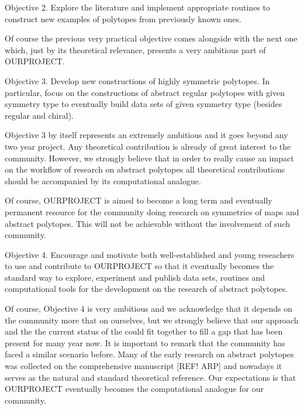 \newpage

Objective 2. Explore the literature and implement appropriate routines to construct new examples of polytopes from previously known ones.

Of course the previous very practical objective comes alongside with the next one which, just by its theoretical relevance, presents a very ambitious part of OURPROJECT.

Objective 3. Develop new constructions of highly symmetric polytopes. In particular, focus on the constructions of abstract regular polytopes with given symmetry type to eventually build data sets of given symmetry type (besides regular and chiral).

Objective 3 by itself represents an extremely ambitious and it goes beyond any two year project. Any theoretical contribution is already of great interest to the community. However, we strongly believe that in order to really cause an impact on the workflow of research on abstract polytopes all theoretical contributions should be accompanied by its computational analogue.

Of course, OURPROJECT is aimed to become a long term and eventually permanent resource for the community doing research on symmetries of maps and abstract polytopes. This will not be achievable without the involvement of such community.

Objective 4. Encourage and motivate both well-established and young reseachers to use and contribute to OURPROJECT so that it eventually becomes the standard way to explore, experiment and publish data sets, routines and computational tools for the development on the research of abstract polytopes.

Of course, Objective 4 is very ambitious and we acknowledge that it depends on the community more that on ourselves, but we strongly believe that our approach and the the current status of the could fit together to fill a gap that has been present for many year now. It is important to remark that the community has faced a similar scenario before. Many of the early research on abstract polytopes was collected on the comprehensive manuscript [REF! ARP] and nowadays it serves as the natural and standard theoretical reference. Our expectations is that OURPROJECT eventually becomes the computational analogue for our community.


